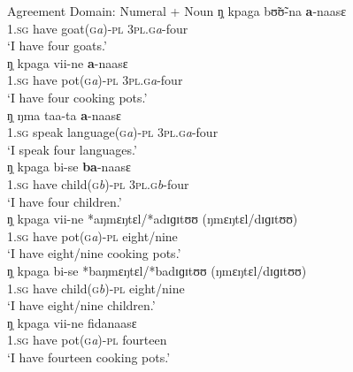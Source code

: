 \begin{exe}
\begin{exe}
\begin{exe}
{\begin{exe}
\begin{exe}
\begin{exe}
\begin{exe}
\begin{exe}
\begin{exe}
\begin{exe}
\begin{xlist}
\begin{exe}
\begin{exe}
\begin{exe}
  \ea\label{ex:NUM-domnum}{\rm Agreement Domain: Numeral + Noun}
\ea\label{ex:NUM-domnumA.pl}
\gll   ŋ̩  kpaga   bʊ̃ʊ̃-na {\bf a}-naasɛ  \\
       \textsc{1.sg}  {have}  {goat(\textsc{g}\textit{a})-\textsc{pl}} 
{\textsc{3pl.g}\textit{a}-four} \\
\glt `I have four goats.' \\


\ex\label{ex:NUM-domnumH-.pl}
\gll   ŋ̩  kpaga vii-ne  {\bf a}-naasɛ  \\
        \textsc{1.sg}  {have}  {pot(\textsc{g}\textit{a})-\textsc{pl}}  
{\textsc{3pl.g}\textit{a}-four} \\
\glt `I have four cooking pots.' \\


\ex\label{ex:NUM-domabst.pl}
\gll  ŋ̩ ŋma  taa-ta {\bf a}-naasɛ  \\
        \textsc{1.sg}  {speak}  {language(\textsc{g}\textit{a})-\textsc{pl}}  
{\textsc{3pl.g}\textit{a}-four} \\
\glt `I speak four languages.' \\


\ex\label{ex:NUM-domnumH+.pl}
\gll   ŋ̩  kpaga bi-se  {\bf ba}-naasɛ \\
        \textsc{1.sg}  {have}  {child(\textsc{g}\textit{b})-\textsc{pl}}  
{\textsc{3pl.g}\textit{b}-four} \\
\glt `I have four children.' \\

\ex\label{ex:NUM-ungramhum-}
\gll   ŋ̩  kpaga vii-ne   *aŋmɛŋtɛl/*adɪɡɪtʊʊ (ŋmɛŋtɛl/dɪɡɪtʊʊ)\\
        \textsc{1.sg}  {have}  {pot(\textsc{g}\textit{a})-\textsc{pl}}  
{} {eight/nine} \\
\glt `I have eight/nine cooking pots.' \\

\ex\label{ex:NUM-ungramhum+}
\gll   ŋ̩  kpaga bi-se   *baŋmɛŋtɛl/*badɪɡɪtʊʊ (ŋmɛŋtɛl/dɪɡɪtʊʊ)\\
     \textsc{1.sg}  {have}  {child(\textsc{g}\textit{b})-\textsc{pl}} 
{} {eight/nine} \\
\glt `I have eight/nine children.' \\

\ex\label{ex:NUM-domnumH+.sg}
\gll     ŋ̩  kpaga vii-ne fidanaasɛ \\
        \textsc{1.sg}  {have}  {pot(\textsc{g}\textit{a})-\textsc{pl}}  
{fourteen} \\
\glt `I have fourteen cooking pots.' \\



\end{exe}
\end{exe}
\end{exe}
\end{xlist}
\end{exe}
\end{exe}
\end{exe}
\end{exe}
\end{exe}
\end{exe}
\end{exe}}
\end{exe}
\end{exe}
\end{exe}
